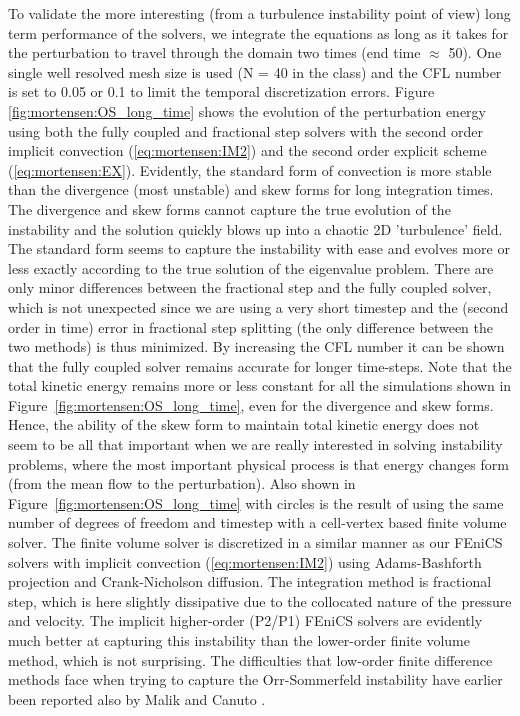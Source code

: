To validate the more interesting (from a turbulence instability point of view) long term performance of the solvers, we integrate the equations as long as it takes for the perturbation to travel through the domain two times (end time $\approx$ 50). One single well resolved mesh size is used (N = 40 in the  class) and the CFL number is set to 0.05 or 0.1 to limit the temporal discretization errors. Figure \ref{fig:mortensen:OS_long_time} shows the evolution of the perturbation energy using both the fully coupled and fractional step solvers with the second order implicit convection (\eqref{eq:mortensen:IM2}) and the second order explicit scheme (\eqref{eq:mortensen:EX}). Evidently, the standard form of convection is more stable than the divergence (most unstable) and skew forms for long integration times. The divergence and skew forms cannot capture the true evolution of the instability and the solution quickly blows up into a chaotic 2D 'turbulence' field. The standard form seems to capture the instability with ease and evolves more or less exactly according to the true solution of the eigenvalue problem. There are only minor differences between the fractional step and the fully coupled solver, which is not unexpected since we are using a very short timestep and the (second order in time) error in fractional step splitting (the only difference between the two methods) is thus minimized. By increasing the CFL number it can be shown that the fully coupled solver remains accurate for longer time-steps. Note that the total kinetic energy remains more or less constant for all the simulations shown in Figure~\ref{fig:mortensen:OS_long_time}, even for the divergence and skew forms. Hence, the ability of the skew form to maintain total kinetic energy does not seem to be all that important when we are really interested in solving instability problems, where the most important physical process is that energy changes form (from the mean flow to the perturbation). Also shown in Figure~\ref{fig:mortensen:OS_long_time} with circles is the result of using the same number of degrees of freedom and timestep with a cell-vertex based finite volume solver. The finite volume solver is discretized in a similar manner as our FEniCS solvers with implicit convection (\eqref{eq:mortensen:IM2}) using Adams-Bashforth projection and Crank-Nicholson diffusion. The integration method is fractional step, which is here slightly dissipative due to the collocated nature of the pressure and velocity. The implicit higher-order (P2/P1) FEniCS solvers are evidently much better at capturing this instability than the lower-order finite volume method, which is not surprising. The difficulties that low-order finite difference methods face when trying to capture the Orr-Sommerfeld instability have earlier been reported also by Malik \cite{MalikZangHussaini1984} and Canuto \cite{CanutoHussainiQuarteroniEtAl2007}.

